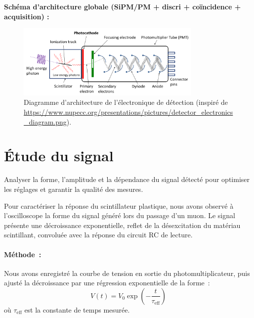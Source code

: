 \documentclass[a4paper,12pt,twoside]{article}
\begin{document}
\vspace{1em}
\noindent
\textbf{Schéma d’architecture globale (SiPM/PM + discri + coïncidence + acquisition) :}

\begin{figure}[H]
  \centering
  \includegraphics[width=0.8\textwidth]{Images/PhotoMultiplierTubeAndScintillator.png}
  \caption{Diagramme d’architecture de l’électronique de détection (inspiré de \url{https://www.nupecc.org/presentations/pictures/detector_electronics_diagram.png}).}
  \label{fig:diagramme_architecture}
\end{figure}

\newpage

\section{Étude du signal}


\vspace{1em}
\begin{center}
\begin{tcolorbox}[colback=blue!5!white, colframe=blue!60!black, title=Principe de l’étude du signal]
Analyser la forme, l’amplitude et la dépendance du signal détecté pour optimiser les réglages et garantir la qualité des mesures.
\end{tcolorbox}
\end{center}


Pour caractériser la réponse du scintillateur plastique, nous avons observé à l’oscilloscope la forme du signal généré lors du passage d’un muon. Le signal présente une décroissance exponentielle, reflet de la désexcitation du matériau scintillant, convoluée avec la réponse du circuit RC de lecture.

\paragraph{Méthode :} Nous avons enregistré la courbe de tension en sortie du photomultiplicateur, puis ajusté la décroissance par une régression exponentielle de la forme :
\[
V(t) = V_0 \exp\left(-\frac{t}{\tau_{\text{eff}}}\right)
\]
où $\tau_{\text{eff}}$ est la constante de temps mesurée.
\end{document}
